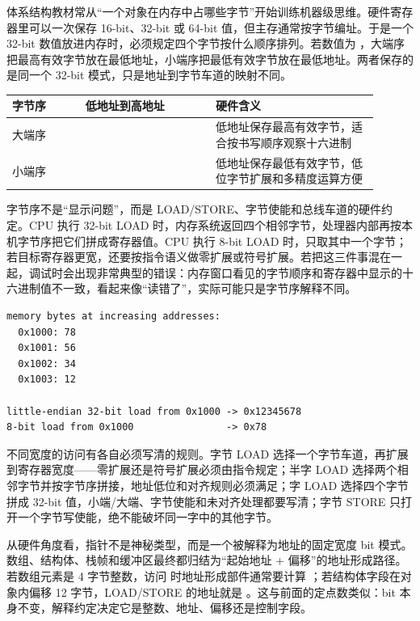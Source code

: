 体系结构教材常从“一个对象在内存中占哪些字节”开始训练机器级思维。硬件寄存器里可以一次保存 16-bit、32-bit 或 64-bit 值，但主存通常按字节编址。于是一个 32-bit 数值放进内存时，必须规定四个字节按什么顺序排列。若数值为 ，大端序把最高有效字节放在最低地址，小端序把最低有效字节放在最低地址。两者保存的是同一个 32-bit 模式，只是地址到字节车道的映射不同。

\begin{longtable}{L{0.18\linewidth}L{0.32\linewidth}L{0.4\linewidth}}
\toprule
字节序 & 低地址到高地址 & 硬件含义 \\
\midrule
大端序 &  & 低地址保存最高有效字节，适合按书写顺序观察十六进制 \\
小端序 &  & 低地址保存最低有效字节，低位字节扩展和多精度运算方便 \\
\bottomrule
\end{longtable}

字节序不是“显示问题”，而是 LOAD/STORE、字节使能和总线车道的硬件约定。CPU 执行 32-bit LOAD 时，内存系统返回四个相邻字节，处理器内部再按本机字节序把它们拼成寄存器值。CPU 执行 8-bit LOAD 时，只取其中一个字节；若目标寄存器更宽，还要按指令语义做零扩展或符号扩展。若把这三件事混在一起，调试时会出现非常典型的错误：内存窗口看见的字节顺序和寄存器中显示的十六进制值不一致，看起来像“读错了”，实际可能只是字节序解释不同。

\begin{lstlisting}
memory bytes at increasing addresses:
  0x1000: 78
  0x1001: 56
  0x1002: 34
  0x1003: 12

little-endian 32-bit load from 0x1000 -> 0x12345678
8-bit load from 0x1000                -> 0x78
\end{lstlisting}

不同宽度的访问有各自必须写清的规则。字节 LOAD 选择一个字节车道，再扩展到寄存器宽度——零扩展还是符号扩展必须由指令规定；半字 LOAD 选择两个相邻字节并按字节序拼接，地址低位和对齐规则必须满足；字 LOAD 选择四个字节拼成 32-bit 值，小端/大端、字节使能和未对齐处理都要写清；字节 STORE 只打开一个字节写使能，绝不能破坏同一字中的其他字节。

从硬件角度看，指针不是神秘类型，而是一个被解释为地址的固定宽度 bit 模式。数组、结构体、栈帧和缓冲区最终都归结为“起始地址 + 偏移”的地址形成路径。若数组元素是 4 字节整数，访问  时地址形成部件通常要计算 ；若结构体字段在对象内偏移 12 字节，LOAD/STORE 的地址就是 。这与前面的定点数类似：bit 本身不变，解释约定决定它是整数、地址、偏移还是控制字段。

